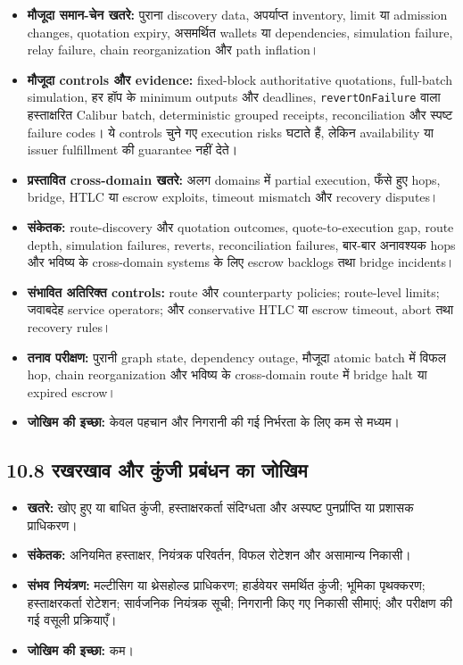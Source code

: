 \documentclass[11pt]{article}
\begin{document}
\begin{itemize}[leftmargin=*]
\item \textbf{मौजूदा समान-चेन खतरे:} पुराना discovery data, अपर्याप्त inventory, limit या admission changes, quotation expiry, असमर्थित wallets या dependencies, simulation failure, relay failure, chain reorganization और path inflation।
\item \textbf{मौजूदा controls और evidence:} fixed-block authoritative quotations, full-batch simulation, हर हॉप के minimum outputs और deadlines, \texttt{revertOnFailure} वाला हस्ताक्षरित Calibur batch, deterministic grouped receipts, reconciliation और स्पष्ट failure codes। ये controls चुने गए execution risks घटाते हैं, लेकिन availability या issuer fulfillment की guarantee नहीं देते।
\item \textbf{प्रस्तावित cross-domain खतरे:} अलग domains में partial execution, फँसे हुए hops, bridge, HTLC या escrow exploits, timeout mismatch और recovery disputes।
\item \textbf{संकेतक:} route-discovery और quotation outcomes, quote-to-execution gap, route depth, simulation failures, reverts, reconciliation failures, बार-बार अनावश्यक hops और भविष्य के cross-domain systems के लिए escrow backlogs तथा bridge incidents।
\item \textbf{संभावित अतिरिक्त controls:} route और counterparty policies; route-level limits; जवाबदेह service operators; और conservative HTLC या escrow timeout, abort तथा recovery rules।
\item \textbf{तनाव परीक्षण:} पुरानी graph state, dependency outage, मौजूदा atomic batch में विफल hop, chain reorganization और भविष्य के cross-domain route में bridge halt या expired escrow।
\item \textbf{जोखिम की इच्छा:} केवल पहचान और निगरानी की गई निर्भरता के लिए कम से मध्यम।
\end{itemize}
\subsection*{10.8 रखरखाव और कुंजी प्रबंधन का जोखिम}

\begin{itemize}[leftmargin=*]
\item \textbf{खतरे:} खोए हुए या बाधित कुंजी, हस्ताक्षरकर्ता संदिग्धता और अस्पष्ट पुनर्प्राप्ति या प्रशासक प्राधिकरण।
\item \textbf{संकेतक:} अनियमित हस्ताक्षर, नियंत्रक परिवर्तन, विफल रोटेशन और असामान्य निकासी।
\item \textbf{संभव नियंत्रण:} मल्टीसिग या थ्रेसहोल्ड प्राधिकरण; हार्डवेयर समर्थित कुंजी; भूमिका पृथक्करण; हस्ताक्षरकर्ता रोटेशन; सार्वजनिक नियंत्रक सूची; निगरानी किए गए निकासी सीमाएं; और परीक्षण की गई वसूली प्रक्रियाएँ।
\item \textbf{जोखिम की इच्छा:} कम।
\end{itemize}
\end{document}
